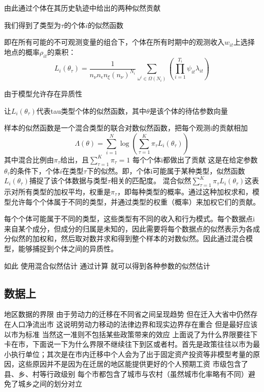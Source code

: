 \documentclass[a4paper,10pt]{article}
\begin{document}
由此通过个体在其历史轨迹中给出的两种似然贡献

我们得到了类型为$\tau$的个体$i$的似然函数

即在所有可能的不可观测变量的组合下，个体在所有时期中的观测收入$w_{it}$上选择地点的概率$\rho_{it}$的乘积：
\begin{equation}
  L_{i}(\theta_{\tau})=\frac{1}{n_{\nu}n_{\epsilon}n_{\xi}(n_{\nu})^{N_{i}}} \sum\limits_{\omega^{i}\in\Omega(N_{i})}(\prod\limits_{i=1}^{T_{i}} \psi_{it}\lambda_{it})
\end{equation}

由于模型允许存在异质性

让$L_{i}(\theta_{\tau})$代表tau类型个体的似然函数，其中$\theta$是该个体的待估参数向量

样本的似然函数是一个混合类型的联合对数似然函数，把每个观测i的贡献相加
\begin{equation}
\Lambda(\theta)=\sum\limits_{i=1}^{N}\log(\sum\limits_{\tau=1}^{K}\pi_{\tau}L_{i}(\theta_{\tau})) 
\end{equation}
其中混合比例由$\pi_{\tau}$给出，且$\sum\limits_{\tau=1}^{K}\pi_{\tau}=1$
每个个体i都做出了贡献
这是在给定参数$\theta_{\tau}$的条件下，个体$i$在类型$\tau$下的似然。即，个体i可能属于某种类型，似然函数
$L_i(\theta_{\tau})$捕捉了该个体数据与类型$\tau$相关的匹配度。
混合似然$\sum_{\tau=1}^{K} \pi_{\tau} L_i(\theta_{\tau})$这表示对所有类型的加权平均，权重是$\pi_{\tau}$，即每种类型的概率。通过这种加权求和，模型允许每个个体属于不同的类型，并通过类型的权重（概率）来加权它们的贡献。

每个个体可能属于不同的类型，这些类型有不同的收入和行为模式。每个数据点i来自某个成分，但成分的归属是未知的，因此需要将每个数据点的似然表示为各成分似然的加权和，然后取对数并求和得到整个样本的对数似然。因此通过混合模型，能够捕捉到个体之间的异质性。


如此
使用混合似然估计
通过计算
就可以得到各种参数的似然估计




\subsection{数据上}

地区数据的界限
由于劳动力的迁移在不同省之间呈现趋势 但在迁入大省中仍然存在人口净流出市 这说明劳动力移动的法律边界和现实边界存在重合 但是最好应该以市为标准 当然这一准则不包括某些政策带来的效应
上面说了为什么界限要往下卡在市，下面说一下为什么界限不继续往下到区或者村。首先是政策往往以市为最小执行单位；其次是在市内迁移中个人会为了出于固定资产投资等非模型考量的原因，这些原因并不是因为在迁居的地区能提供更好的个人预期工资
市级包含了县、乡、村等行政级别 每个市都包含了城市与农村（虽然城市化率略有不同）避免了城乡之间的划分对立
\end{document}

